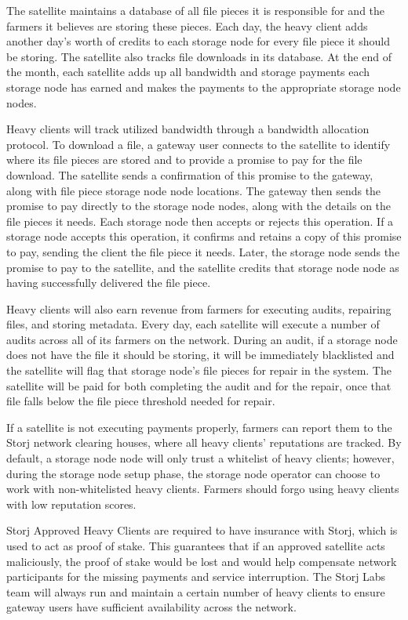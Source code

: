 \documentclass[a4paper,10pt]{article} \usepackage[utf8]{inputenc}
\begin{document}
The satellite maintains a database of all file pieces it is responsible for
and the farmers it believes are storing these pieces. Each day, the heavy
client adds another day’s worth of credits to each storage node for every file 
piece
it should be storing. The satellite
also tracks file downloads in its database. 
At the end of the month, each satellite
adds up all bandwidth and storage payments each storage node has earned and 
makes
the payments to the appropriate storage node nodes.

Heavy clients will track utilized bandwidth through a bandwidth allocation
protocol. To download a file, a gateway user connects to the satellite to
identify where its file pieces are stored and to provide a promise to pay for
the file download. The satellite sends a confirmation of this promise 
to the gateway, along with file piece storage node node locations. 
The gateway then sends the promise to pay directly
to the storage node nodes, along with the details on the file pieces it needs. 
Each storage node then accepts or rejects this operation. 
If a storage node accepts this
operation, it confirms and retains a copy of this promise to pay, sending the
client the file piece it needs. Later, the storage node sends the promise to 
pay to
the satellite, and the satellite credits that storage node node as having
successfully delivered the file piece.

Heavy clients will also earn revenue from farmers for executing audits,
repairing files, and storing metadata. Every day, each satellite will execute
a number of audits across all of its farmers on the network. During an audit,
if a storage node does not have the file it should be storing, it will be 
immediately
blacklisted and the satellite will flag that storage node’s file pieces for 
repair
in the system. 
The satellite will be paid for both completing the audit 
and for the repair, 
once that file falls below the file piece threshold needed for
repair.

If a satellite is not executing payments properly, farmers can report them
to the Storj network clearing houses, where all heavy clients’ reputations are
tracked. By default, a storage node node will only trust a whitelist of heavy
clients; however, during the storage node setup phase, the storage node 
operator can choose
to work with non-whitelisted heavy clients. 
Farmers should forgo using heavy clients with low reputation scores.

Storj Approved Heavy Clients are required to have insurance with Storj, 
which is used to act as proof of stake. 
This guarantees that if an approved satellite acts maliciously, 
the proof of stake would
be lost and would help compensate network participants for the missing payments
and service interruption. The Storj Labs team will always run and maintain a
certain number of heavy clients to ensure gateway users have sufficient
availability across the network.
\end{document}
